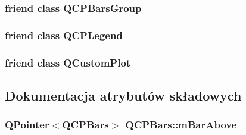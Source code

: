 \subsubsection[{\texorpdfstring{Q\+C\+P\+Bars\+Group}{QCPBarsGroup}}]{\setlength{\rightskip}{0pt plus 5cm}friend class {\bf Q\+C\+P\+Bars\+Group}\hspace{0.3cm}{\ttfamily [friend]}}\hypertarget{class_q_c_p_bars_ae1051b4d58a2786cb420367a586e2fee}{}\label{class_q_c_p_bars_ae1051b4d58a2786cb420367a586e2fee}
\subsubsection[{\texorpdfstring{Q\+C\+P\+Legend}{QCPLegend}}]{\setlength{\rightskip}{0pt plus 5cm}friend class {\bf Q\+C\+P\+Legend}\hspace{0.3cm}{\ttfamily [friend]}}\hypertarget{class_q_c_p_bars_a8429035e7adfbd7f05805a6530ad5e3b}{}\label{class_q_c_p_bars_a8429035e7adfbd7f05805a6530ad5e3b}
\subsubsection[{\texorpdfstring{Q\+Custom\+Plot}{QCustomPlot}}]{\setlength{\rightskip}{0pt plus 5cm}friend class {\bf Q\+Custom\+Plot}\hspace{0.3cm}{\ttfamily [friend]}}\hypertarget{class_q_c_p_bars_a1cdf9df76adcfae45261690aa0ca2198}{}\label{class_q_c_p_bars_a1cdf9df76adcfae45261690aa0ca2198}


\subsection{Dokumentacja atrybutów składowych}
\subsubsection[{\texorpdfstring{m\+Bar\+Above}{mBarAbove}}]{\setlength{\rightskip}{0pt plus 5cm}Q\+Pointer$<${\bf Q\+C\+P\+Bars}$>$ Q\+C\+P\+Bars\+::m\+Bar\+Above\hspace{0.3cm}{\ttfamily [protected]}}\hypertarget{class_q_c_p_bars_a0c1c46076c41a478dbb373cfd35929aa}{}\label{class_q_c_p_bars_a0c1c46076c41a478dbb373cfd35929aa}
